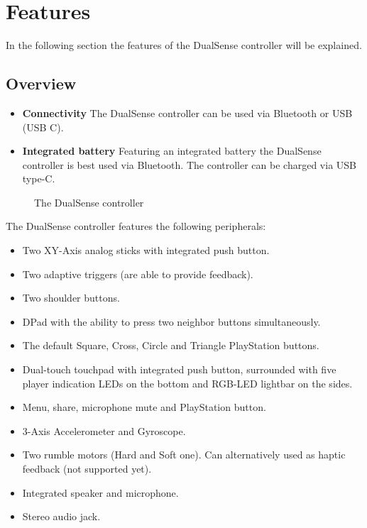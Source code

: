 \section{Features}
In the following section the features of the DualSense controller will be explained.

\subsection{Overview}
\begin{itemize}
	\item \textbf{Connectivity} The DualSense controller can be used via Bluetooth or USB (USB C).
	\item \textbf{Integrated battery} Featuring an integrated battery the DualSense controller is best used via Bluetooth. The controller can be charged via USB type-C.
\end{itemize}

\begin{figure}[H]
    \centering
    \qquad
    \caption{The DualSense controller}
\end{figure}

The DualSense controller features the following peripherals:
\begin{itemize}
	\item Two XY-Axis analog sticks with integrated push button.
	\item Two adaptive triggers (are able to provide feedback).
	\item Two shoulder buttons.
	\item DPad with the ability to press two neighbor buttons simultaneously.
	\item The default Square, Cross, Circle and Triangle PlayStation buttons.
	\item Dual-touch touchpad with integrated push button, surrounded with five player indication LEDs on the bottom and RGB-LED lightbar on the sides.
	\item Menu, share, microphone mute and PlayStation button.
	\item 3-Axis Accelerometer and Gyroscope.
	\item Two rumble motors (Hard and Soft one). Can alternatively used as haptic feedback (not supported yet).
	\item Integrated speaker and microphone.
	\item Stereo audio jack.	
\end{itemize}

